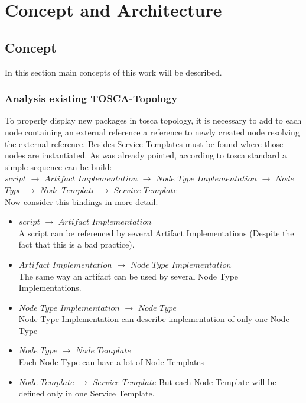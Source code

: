 
\chapter{Concept and Architecture}\label{chap:conarch}
\section{Concept}
In this section main concepts of this work will be described.

\subsection{Analysis existing TOSCA-Topology}\label{subs:analyse}
To properly display new packages in \gls{tosca} topology, it is necessary to add to each node containing an external reference a reference to newly created node resolving the external reference. 
Besides Service Templates must be found where those nodes are instantiated.
As was already pointed, according to \gls{tosca} standard a simple sequence can be build:\\
$script$ $\rightarrow$ $Artifact$ $Implementation$ $\rightarrow$ $Node$ $Type$ $Implementation$ $\rightarrow$ $Node$ $Type$ $\rightarrow$ $Node$ $Template$ $\rightarrow$ $Service$ $Template$\\
Now consider this bindings in more detail. 
\begin{itemize}
	\item $script$ $\rightarrow$ $Artifact$ $Implementation$\\
	A script can be referenced by several Artifact Implementations (Despite the fact that this is a bad practice).
	\item  $Artifact$ $Implementation$ $\rightarrow$ $Node$ $Type$ $Implementation$ \\
	The same way an artifact can be used by several Node Type Implementations.
	\item $Node$ $Type$ $Implementation$ $\rightarrow$ $Node$ $Type$ \\
	Node Type Implementation can describe implementation of only one Node Type
	\item  $Node$ $Type$ $\rightarrow$ $Node$ $Template$\\
	Each Node Type can have a lot of Node Templates
	\item  $Node$ $Template$ $\rightarrow$ $Service$ $Template$
	But each Node Template will be defined only in one Service Template.
\end{itemize}
